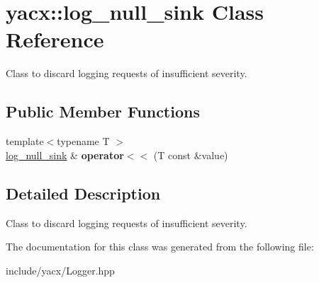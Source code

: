 \hypertarget{classyacx_1_1log__null__sink}{}\section{yacx\+:\+:log\+\_\+null\+\_\+sink Class Reference}
\label{classyacx_1_1log__null__sink}


Class to discard logging requests of insufficient severity.  


\subsection*{Public Member Functions}
\begin{DoxyCompactItemize}
\item 
\mbox{\label{classyacx_1_1log__null__sink_adbd781925f06305ee955960f7cf11001}} 
{\footnotesize template$<$typename T $>$ }\\\hyperlink{classyacx_1_1log__null__sink}{log\+\_\+null\+\_\+sink} \& {\bfseries operator$<$$<$} (T const \&value)
\end{DoxyCompactItemize}


\subsection{Detailed Description}
Class to discard logging requests of insufficient severity. 

The documentation for this class was generated from the following file\+:\begin{DoxyCompactItemize}
\item 
include/yacx/Logger.\+hpp\end{DoxyCompactItemize}
